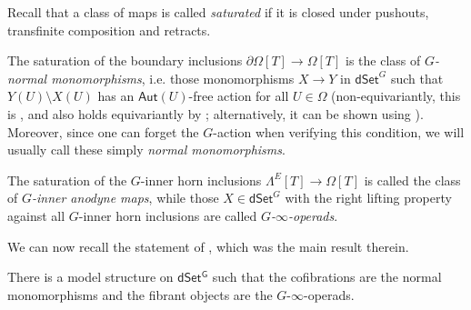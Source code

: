\documentclass[a4paper,10pt
 ,draft
]{article}%
\begin{document}



Recall that a class of maps is called \textit{saturated} if it is closed under pushouts, transfinite composition and retracts. 


The saturation of the boundary inclusions 
$\partial \Omega[T] \to \Omega[T]$
is the class of \textit{$G$-normal monomorphisms},
i.e. those monomorphisms $X \to Y$ in $\mathsf{dSet}^G$ such that
$Y(U) \setminus X(U)$ has an $\mathsf{Aut}(U)$-free action for all $U \in \Omega$ (non-equivariantly, this is \cite[Prop. 1.5]{CM11}, and also holds equivariantly by \cite[Rem. 6.7]{Per18}; alternatively, it can be shown using \cite[Props. 6.5(ii) and 5.62]{Per18}).
Moreover, since one can forget the $G$-action when verifying this condition, we will usually call these simply \textit{normal monomorphisms}. 


The saturation of the $G$-inner horn inclusions 
$\Lambda^E[T] \to \Omega[T]$
is called the class of \textit{$G$-inner anodyne maps}, 
while those $X \in \mathsf{dSet}^G$
with the right lifting property against all $G$-inner horn inclusions are called \textit{$G$-$\infty$-operads}.

We can now recall the statement of \cite[Thm 2.1]{Per18}, which was the main result therein.

\begin{theorem}\label{DSETGMODEL THM}
	There is a model structure on $\mathsf{dSet^G}$
	such that the cofibrations are the normal monomorphisms and the fibrant objects are the $G$-$\infty$-operads.
\end{theorem}
\end{document}
